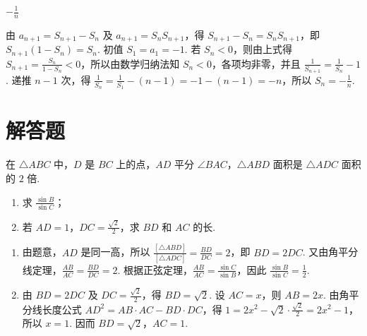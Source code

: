 \begin{answer}
\(-\frac{1}{n}\)
\end{answer}

\begin{solution}
由 \(a_{n+1}=S_{n+1}-S_n\) 及 \(a_{n+1}=S_nS_{n+1}\)，得 \(S_{n+1}-S_n=S_nS_{n+1}\)，即 \(S_{n+1}(1-S_n)=S_n\). 初值 \(S_1=a_1=-1\). 若 \(S_n<0\)，则由上式得 \(S_{n+1}=\frac{S_n}{1-S_n}<0\)，所以由数学归纳法知 \(S_n<0\)，各项均非零，并且
\(\frac{1}{S_{n+1}}=\frac{1}{S_n}-1\).
递推 \(n-1\) 次，得 \(\frac{1}{S_n}=\frac{1}{S_1}-(n-1)=-1-(n-1)=-n\)，所以 \(S_n=-\frac1n\).
\end{solution}

\section{解答题}

\begin{problem}
在 \(\triangle ABC\) 中，\(D\) 是 \(BC\) 上的点，\(AD\) 平分 \(\angle BAC\)，\(\triangle ABD\) 面积是 \(\triangle ADC\) 面积的 \(2\) 倍.

\begin{enumerate}
\item 求 \(\frac{\sin B}{\sin C}\)；
\item 若 \(AD=1\)，\(DC=\frac{\sqrt{2}}{2}\)，求 \(BD\) 和 \(AC\) 的长.
\end{enumerate}
\end{problem}

\begin{solution}
\begin{enumerate}
\item 由题意，\(AD\) 是同一高，所以 \(\frac{[\triangle ABD]}{[\triangle ADC]}=\frac{BD}{DC}=2\)，即 \(BD=2DC\). 又由角平分线定理，\(\frac{AB}{AC}=\frac{BD}{DC}=2\). 根据正弦定理，\(\frac{AB}{AC}=\frac{\sin C}{\sin B}\)，因此 \(\frac{\sin B}{\sin C}=\frac12\).
\item 由 \(BD=2DC\) 及 \(DC=\frac{\sqrt2}{2}\)，得 \(BD=\sqrt2\). 设 \(AC=x\)，则 \(AB=2x\). 由角平分线长度公式 \(AD^2=AB\cdot AC-BD\cdot DC\)，得 \(1=2x^2-\sqrt2\cdot\frac{\sqrt2}{2}=2x^2-1\)，所以 \(x=1\). 因而 \(BD=\sqrt2\)，\(AC=1\).
\end{enumerate}
\end{solution}

